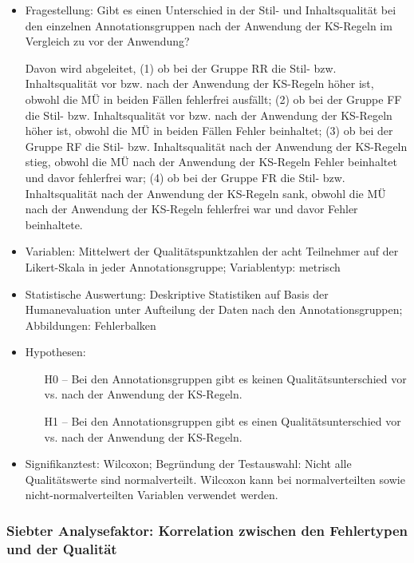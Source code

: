 \begin{itemize}
\item Fragestellung: Gibt es einen Unterschied in der Stil- und Inhaltsqualität bei den einzelnen Annotationsgruppen nach der Anwendung der KS-Regeln im Vergleich zu vor der Anwendung?

Davon wird abgeleitet, (1) ob bei der Gruppe RR die Stil- bzw. Inhaltsqualität vor bzw. nach der Anwendung der KS-Regeln höher ist, obwohl die MÜ in beiden Fällen fehlerfrei ausfällt; (2) ob bei der Gruppe FF die Stil- bzw. Inhaltsqualität vor bzw. nach der Anwendung der KS-Regeln höher ist, obwohl die MÜ in beiden Fällen Fehler beinhaltet; (3) ob bei der Gruppe RF die Stil- bzw. Inhaltsqualität nach der Anwendung der KS-Regeln stieg, obwohl die MÜ nach der Anwendung der KS-Regeln Fehler beinhaltet und davor fehlerfrei war; (4) ob bei der Gruppe FR die Stil- bzw. Inhaltsqualität nach der Anwendung der KS-Regeln sank, obwohl die MÜ nach der Anwendung der KS-Regeln fehlerfrei war und davor Fehler beinhaltete.

\item Variablen: Mittelwert der Qualitätspunktzahlen der acht Teilnehmer auf der Likert-Skala in jeder Annotationsgruppe; Variablentyp: metrisch
\item Statistische Auswertung: Deskriptive Statistiken auf Basis der Humanevaluation unter Aufteilung der Daten nach den Annotationsgruppen; Abbildungen: Fehlerbalken
\item Hypothesen:

  \begin{itemize}[align=left]
  \item [H0 --] Bei den Annotationsgruppen gibt es keinen Qualitätsunterschied vor vs. nach der Anwendung der KS-Regeln.

  \item [H1 --] Bei den Annotationsgruppen gibt es einen Qualitätsunterschied vor vs. nach der Anwendung der KS-Regeln.
  \end{itemize}

\item Signifikanztest: Wilcoxon; Begründung der Testauswahl: Nicht alle Qualitätswerte sind normalverteilt. Wilcoxon kann bei normalverteilten sowie nicht-normalverteilten Variablen verwendet werden.
\end{itemize}

\subsubsection{Siebter Analysefaktor: Korrelation zwischen den Fehlertypen und der Qualität}

